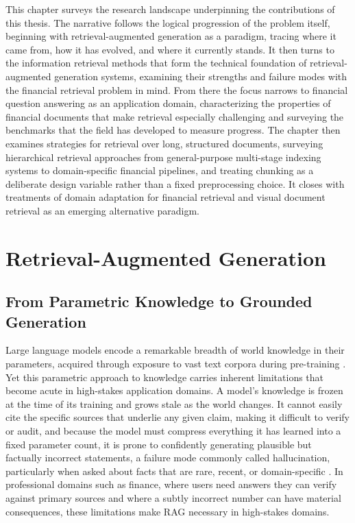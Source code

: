 \documentclass[12pt,twoside,maitrise]{dms}
\theoremstyle{definition}
\numberwithin{equation}{section}
\numberwithin{table}{chapter}
\numberwithin{figure}{chapter}
\begin{document}
This chapter surveys the research landscape underpinning the contributions of this
thesis. The narrative follows the logical progression of the problem itself, beginning
with retrieval-augmented generation as a paradigm, tracing where it came from, how it
has evolved, and where it currently stands. It then turns to the information retrieval
methods that form the technical foundation of retrieval-augmented generation systems, examining their strengths and
failure modes with the financial retrieval problem in mind. From there the focus narrows
to financial question answering as an application domain, characterizing the properties
of financial documents that make retrieval especially challenging and surveying the
benchmarks that the field has developed to measure progress. The chapter then examines strategies for retrieval over long, structured documents,
surveying hierarchical retrieval approaches from general-purpose multi-stage indexing
systems to domain-specific financial pipelines, and treating chunking as a deliberate
design variable rather than a fixed preprocessing choice. It closes with treatments of
domain adaptation for financial retrieval and visual document retrieval as an emerging
alternative paradigm.


\section{Retrieval-Augmented Generation}

\subsection{From Parametric Knowledge to Grounded Generation}

Large language models encode a remarkable breadth of world knowledge in their parameters,
acquired through exposure to vast text corpora during pre-training \citep{brown2020language}. Yet this parametric
approach to knowledge carries inherent limitations that become acute in high-stakes
application domains. A model's knowledge is frozen at the time of its training and grows
stale as the world changes. It cannot easily cite the specific sources that underlie any
given claim, making it difficult to verify or audit, and because the model must compress
everything it has learned into a fixed parameter count, it is prone to confidently
generating plausible but factually incorrect statements, a failure mode commonly called
hallucination, particularly when asked about facts that are rare, recent, or
domain-specific \citep{brown2020language, ji2023survey}. In professional domains such
as finance, where users need answers they can verify against primary sources and where a
subtly incorrect number can have material consequences, these limitations make RAG necessary in high-stakes domains.
\end{document}

